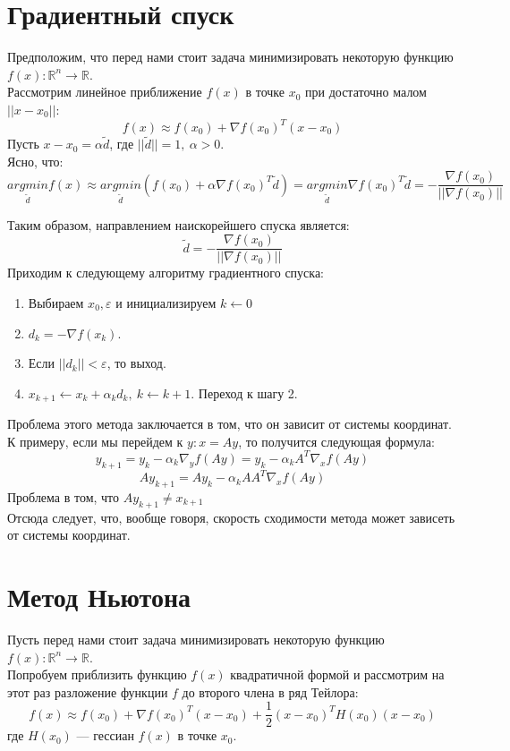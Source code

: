 \documentclass[a4paper,12pt]{article}
\begin{document}
\newpage 

\section{Градиентный спуск}
Предположим, что перед нами стоит задача минимизировать некоторую функцию $f(x) : \mathbb{R}^{n} \rightarrow \mathbb{R}$. \\
Рассмотрим линейное приближение $f(x)$ в точке $x_0$ при достаточно малом $||x - x_0||$:
$$f(x) \approx f(x_0) + \nabla{f(x_0)}^{T}(x - x_0)$$
Пусть $x - x_0 = \alpha \widetilde{d} $, где $||\widetilde{d}|| = 1, ~ \alpha > 0$.  \\ 
Ясно, что:
$$\underset{\widetilde{d}}{argmin} f(x) \approx 
\underset{\widetilde{d}}{argmin} (f(x_0) + \alpha \nabla{f(x_0)}^{T}\widetilde{d}) = 
\underset{\widetilde{d}}{argmin} \nabla{f(x_0)}^{T}\widetilde{d} = 
-\frac{\nabla{f(x_0)}}{||\nabla{f(x_0)}||}$$

\noindent Таким образом, направлением наискорейшего спуска является:
$$\widetilde{d} = -\frac{\nabla{f(x_0)}}{||\nabla{f(x_0)}||}$$
Приходим к следующему алгоритму градиентного спуска:
\begin{enumerate}
    \item Выбираем $x_0, \varepsilon $ и инициализируем $k \leftarrow 0$
    \item $d_k = -\nabla{f(x_k)}$.
    \item Если $||d_k|| < \varepsilon$, то выход.
    \item $x_{k+1} \leftarrow x_{k} + \alpha_k d_k, ~ k \leftarrow k + 1$. Переход к шагу 2. 
\end{enumerate}

Проблема этого метода заключается в том, что он зависит от системы координат. К примеру, если
мы перейдем к $y: x = Ay$, то получится следующая формула: \\
$$y_{k+1} = y_{k} - \alpha_k \nabla_y{f(Ay)} = y_{k} - \alpha_k A^T \nabla_x{f(Ay)}$$
$$Ay_{k+1} = Ay_{k} - \alpha_k AA^T \nabla_x{f(Ay)}$$
Проблема в том, что $Ay_{k+1} \neq x_{k+1}$ \\

Отсюда следует, что, вообще говоря, скорость сходимости метода может зависеть от системы координат. \\

\newpage


\section{Метод Ньютона}
Пусть перед нами стоит задача минимизировать некоторую функцию $f(x) : \mathbb{R}^{n} \rightarrow \mathbb{R}$. \\
Попробуем приблизить функцию $f(x)$ квадратичной формой и рассмотрим на этот раз разложение функции $f$ до второго члена в ряд Тейлора:
$$f(x) \approx f(x_0) + \nabla{f(x_0)}^T(x - x_0) + \frac{1}{2}(x - x_0)^TH(x_0)(x - x_0)$$
где $H(x_0)$ --- гессиан $f(x)$ в точке $x_0$.
\end{document}
